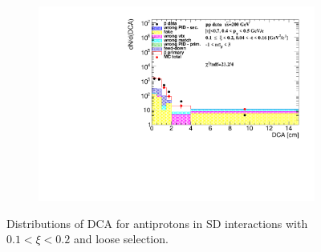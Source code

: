 \begin{figure}[h!]
\begin{subfigure}{.45\textwidth}
		\includegraphics[width=\linewidth, page=14]{chapters/chrgSTAR/img/DCAproton/background_p_bar_2.pdf}
	\end{subfigure}
	\caption{Distributions of DCA for antiprotons in SD interactions with $0.1 < \xi<0.2$ and loose selection.}
	\label{fig:dca_proton_bar_2}
\end{figure}
